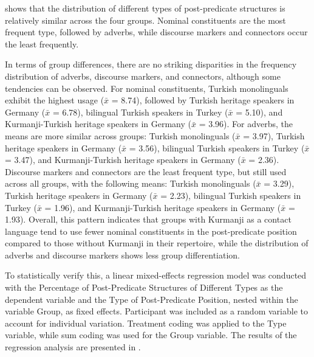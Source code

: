  shows that the distribution of different types of post-predicate structures is relatively similar across the four groups. Nominal constituents are the most frequent type, followed by adverbs, while discourse markers and connectors occur the least frequently.

\largerpage
In terms of group differences, there are no striking disparities in the frequency distribution of adverbs, discourse markers, and connectors, although some tendencies can be observed. For nominal constituents, Turkish monolinguals exhibit the highest usage ($\bar{x}$ = 8.74), followed by Turkish heritage speakers in Germany ($\bar{x}$ = 6.78), bilingual Turkish speakers in Turkey ($\bar{x}$ = 5.10), and Kurmanji-Turkish heritage speakers in Germany ($\bar{x}$ = 3.96). For adverbs, the means are more similar across groups: Turkish monolinguals ($\bar{x}$ = 3.97), Turkish heritage speakers in Germany ($\bar{x}$ = 3.56), bilingual Turkish speakers in Turkey ($\bar{x}$ = 3.47), and Kurmanji-Turkish heritage speakers in Germany ($\bar{x}$ = 2.36). Discourse markers and connectors are the least frequent type, but still used across all groups, with the following means: Turkish monolinguals ($\bar{x}$ = 3.29), Turkish heritage speakers in Germany ($\bar{x}$ = 2.23), bilingual Turkish speakers in Turkey ($\bar{x}$ = 1.96), and Kurmanji-Turkish heritage speakers in Germany ($\bar{x}$ = 1.93). Overall, this pattern indicates that groups with Kurmanji as a contact language tend to use fewer nominal constituents in the post-predicate position compared to those without Kurmanji in their repertoire, while the distribution of adverbs and discourse markers shows less group differentiation.

To statistically verify this, a linear mixed-effects regression model was conducted with the Percentage of Post-Predicate Structures of Different Types as the dependent variable and the Type of Post-Predicate Position, nested within the variable Group, as fixed effects. Participant was included as a random variable to account for individual variation. Treatment coding was applied to the Type variable, while sum coding was used for the Group variable. The results of the regression analysis are presented in .

